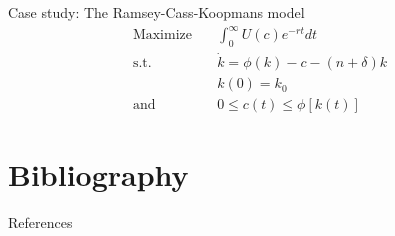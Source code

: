 \documentclass[10pt]{beamer}
\begin{document}
\begin{frame}[label={sec:orgfe38dbb}]{Case study: The Ramsey-Cass-Koopmans model}
\begin{align*}
\text{Maximize} \quad & \int_0^{\infty} U(c)e^{-rt} dt \\
\text{s.t.} \quad     & \dot{k} = \phi(k) -c - (n + \delta)k \\
                  & k(0) = k_{0} \\
\text{and} \quad      & 0 \leq c(t) \leq \phi[k(t)]
\end{align*}
\end{frame}

\section{Bibliography}
\label{sec:org2cab552}
\begin{frame}[label={sec:org683edaa}]{References}
\printbibliography
\end{frame}
\end{document}
